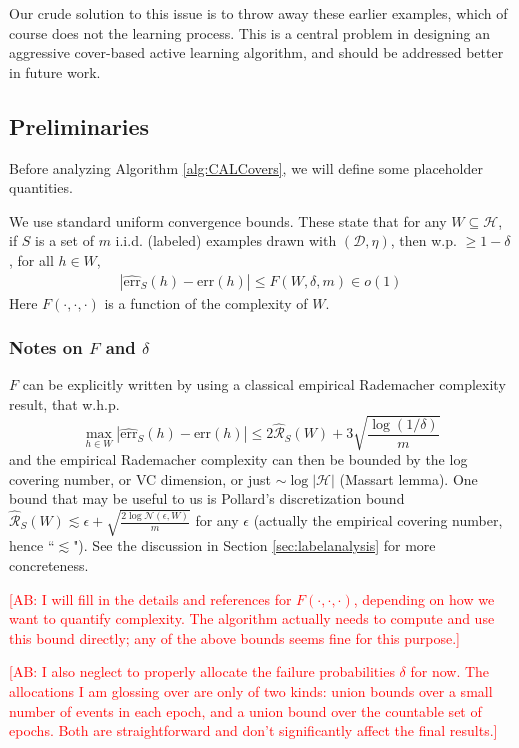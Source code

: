 \documentclass{article}[12pt]
\newcommand{\authcmt}[2]{\ifnum\Comments=1\textcolor{#1}{#2}\fi}
\newcommand{\akshay}[1]{\authcmt{red}      {[AB: #1]}}
\theoremstyle{named}
\newcommand{\abs}[1]{\left| #1 \right|}
\newcommand{\err}[1]{\mbox{err}\left(#1\right)}
\newcommand{\emperr}[2]{\widehat{\mbox{err}}_{#2} \left(#1\right)}
\newcommand{\cH}{\mathcal{H}}
\newcommand{\cR}{\mathcal{R}}
\newcommand{\cD}{\mathcal{D}}
\newcommand{\cN}{\mathcal{N}}
\begin{document}
Our crude solution to this issue is to throw away these earlier examples, 
which of course does not the learning process. 
This is a central problem in designing an aggressive cover-based active learning algorithm, 
and should be addressed better in future work.


\subsection{Preliminaries}
Before analyzing Algorithm \ref{alg:CALCovers}, we will define some placeholder quantities. 


We use standard uniform convergence bounds. 
These state that for any $W \subseteq \cH$,
if $S$ is a set of $m$ i.i.d. (labeled) examples drawn with $(\cD, \eta)$, 
then w.p. $\geq 1-\delta$, for all $h \in W$,
\begin{align}
\label{fullsetsampskeleton}
\abs{\emperr{h}{S} - \err{h}} \leq F (W, \delta, m) \in o(1)
\end{align}
Here $F(\cdot, \cdot, \cdot)$ is a function of the complexity of $W$. 

\subsubsection{Notes on $F$ and $\delta$}
\label{sec:concreteFanddelta}
$F$ can be explicitly written by using a classical empirical Rademacher complexity result, that w.h.p.
$$\max_{h \in W} \abs{\emperr{h}{S} - \err{h}} \leq 2 \hat{\cR}_S(W) + 3 \sqrt{\frac{\log (1/\delta)}{m}}$$
and the empirical Rademacher complexity can then be bounded by the log covering number, or VC dimension, 
or just $\sim \log \abs{\cH}$ (Massart lemma).
One bound that may be useful to us is Pollard's discretization bound 
$\hat{\cR}_S(W) \lesssim \epsilon + \sqrt{\frac{2 \log \cN(\epsilon, W) }{m}}$ for any $\epsilon$
(actually the empirical covering number, hence ``$\lesssim$").
See the discussion in Section \ref{sec:labelanalysis} for more concreteness.


\akshay{I will fill in the details and references for $F(\cdot, \cdot, \cdot)$, depending on how we want to 
quantify complexity. 
The algorithm actually needs to compute and use this bound directly; 
any of the above bounds seems fine for this purpose.}

\akshay{I also neglect to properly allocate the failure probabilities $\delta$ for now. 
The allocations I am glossing over are only of two kinds: 
union bounds over a small number of events in each epoch, 
and a union bound over the countable set of epochs. 
Both are straightforward and don't significantly affect the final results.}
\end{document}
